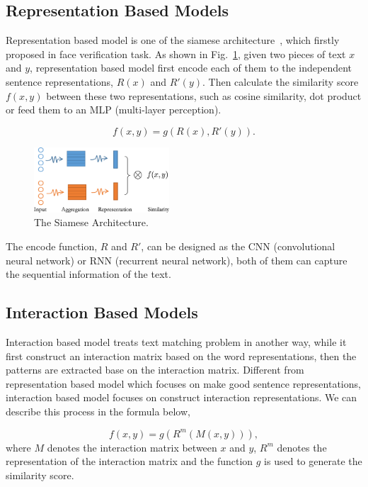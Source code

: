 \documentclass[12pt]{article}
\begin{document}
\subsection{Representation Based Models}

Representation based model is one of the siamese architecture~\cite{}, which firstly proposed in face verification task. As shown in Fig.~\ref{Fig.siamese}, given two pieces of text $x$ and $y$, representation based model first encode each of them to the independent sentence representations, $R(x)$ and $R'(y)$. Then calculate the similarity score $f(x,y)$ between these two representations, such as cosine similarity, dot product or feed them to an MLP (multi-layer perception).

\begin{equation}
	f(x,y) = g(R(x), R'(y)).
\end{equation}

\begin{figure}[ht]
  \centering
  \includegraphics[width=0.45\textwidth]{../img/siamese}
  \caption{The Siamese Architecture.} \label{Fig.siamese}
\end{figure}

The encode function, $R$ and $R'$, can be designed as the CNN (convolutional neural network) or RNN (recurrent neural network), both of them can capture the sequential information of the text. 


\subsection{Interaction Based Models}

Interaction based model treats text matching problem in another way, while it first construct an interaction matrix based on the word representations, then the patterns are extracted base on the interaction matrix. Different from representation based model which focuses on make good sentence representations, interaction based model focuses on construct interaction representations. We can describe this process in the formula below,

\begin{equation}
	f(x, y) = g(R^m(M(x,y))),
\end{equation}
where $M$ denotes the interaction matrix between $x$ and $y$, $R^m$ denotes the representation of the interaction matrix and the function $g$ is used to generate the similarity score.
\end{document}
